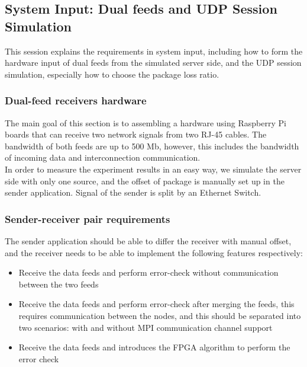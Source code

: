 \documentclass[11pt,openright,a4paper]{report}
\begin{document}
\subsection{System Input: Dual feeds and UDP Session Simulation}
This session explains the requirements in system input, including how to form the hardware input of dual feeds from the simulated server side, and the UDP session simulation, especially how to choose the package loss ratio.\\
\subsubsection{Dual-feed receivers hardware}
The main goal of this section is to assembling a hardware using Raspberry Pi boards that can receive two network signals from two RJ-45 cables. The bandwidth of both feeds are up to 500 Mb, however, this includes the bandwidth of incoming data and interconnection communication.\\
In order to measure the experiment results in an easy way, we simulate the server side with only one source, and the offset of package is manually set up in the sender application. Signal of the sender is split by an Ethernet Switch.\\

\subsubsection{Sender-receiver pair requirements}
The sender application should be able to differ the receiver with manual offset, and the receiver needs to be able to implement the following features respectively:
\begin{itemize}
	\item Receive the data feeds and perform error-check without communication between the two feeds
	\item Receive the data feeds and perform error-check after merging the feeds, this requires communication between the nodes, and this should be separated into two scenarios: with and without MPI communication channel support
	\item Receive the data feeds and introduces the FPGA algorithm to perform the error check
\end{itemize}
\end{document}

